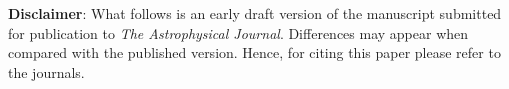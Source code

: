 \documentclass[../../main/thesis_msc.tex]{subfiles}
\begin{document}
		\newline
		\noindent \textbf{Disclaimer}: What follows is an early draft version of the manuscript submitted for publication to \textit{The Astrophysical Journal}. Differences may appear when compared with the published version. Hence, for citing this paper please refer to the journals.

	 \newpage

     
     
	

	
\end{document}
